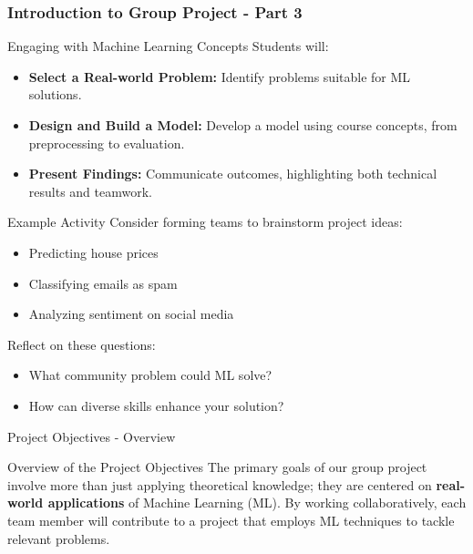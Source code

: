\documentclass[aspectratio=169]{beamer}
\begin{document}
\begin{frame}[fragile]
    \frametitle{Introduction to Group Project - Part 3}
    \begin{block}{Engaging with Machine Learning Concepts}
        Students will:
        \begin{itemize}
            \item \textbf{Select a Real-world Problem:} Identify problems suitable for ML solutions.
            \item \textbf{Design and Build a Model:} Develop a model using course concepts, from preprocessing to evaluation.
            \item \textbf{Present Findings:} Communicate outcomes, highlighting both technical results and teamwork.
        \end{itemize}
    \end{block}
    \begin{block}{Example Activity}
        Consider forming teams to brainstorm project ideas:
        \begin{itemize}
            \item Predicting house prices
            \item Classifying emails as spam
            \item Analyzing sentiment on social media
        \end{itemize}
        Reflect on these questions:
        \begin{itemize}
            \item What community problem could ML solve?
            \item How can diverse skills enhance your solution?
        \end{itemize}
    \end{block}
\end{frame}

\begin{frame}[fragile]{Project Objectives - Overview}
    \begin{block}{Overview of the Project Objectives}
        The primary goals of our group project involve more than just applying theoretical knowledge; they are centered on \textbf{real-world applications} of Machine Learning (ML). By working collaboratively, each team member will contribute to a project that employs ML techniques to tackle relevant problems. 
    \end{block}
\end{frame}
\end{document}
